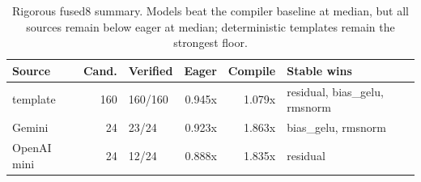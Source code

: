 \begin{table}[htbp]
\centering
\caption{Rigorous fused8 summary. Models beat the compiler baseline at median, but all sources remain below eager at median; deterministic templates remain the strongest floor.}
\label{tab:fused8-summary}
\small
\begin{tabularx}{\linewidth}{l r l r r X}
\toprule
Source & Cand. & Verified & Eager & Compile & Stable wins \\
\midrule
template & 160 & 160/160 & 0.945x & 1.079x & residual, bias\_gelu, rmsnorm \\
Gemini & 24 & 23/24 & 0.923x & 1.863x & bias\_gelu, rmsnorm \\
OpenAI mini & 24 & 12/24 & 0.888x & 1.835x & residual \\
\bottomrule
\end{tabularx}
\end{table}
